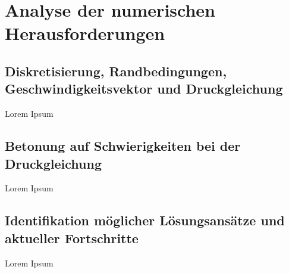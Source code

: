 \section{Analyse der numerischen Herausforderungen}

\subsection{Diskretisierung, Randbedingungen, Geschwindigkeitsvektor und Druckgleichung}
Lorem Ipsum

\subsection{Betonung auf Schwierigkeiten bei der Druckgleichung}
Lorem Ipsum

\subsection{Identifikation möglicher Lösungsansätze und aktueller Fortschritte}
Lorem Ipsum